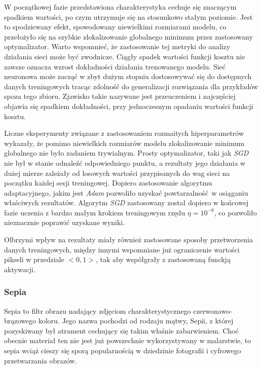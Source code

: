     W początkowej fazie przedstawiona charakterystyka cechuje się znaczącym spadkiem
    wartości, po czym utrzymuje się na stosunkowo stałym poziomie. Jest to spodziewany
    efekt, spowodowany niewielkimi rozmiarami modelu, co przełożyło się na szybkie
    zlokalizowanie globalnego minimum przez zastosowany optymalizator. Warto wspomnieć,
    że zastosowanie tej metryki do analizy działania sieci może być zwodnicze.
    Ciągły spadek wartości funkcji kosztu nie zawsze oznacza wzrost dokładności działania
    trenowanego modelu. Sieć neuronowa może zacząć w zbyt dużym stopniu dostosowywać się
    do dostępnych danych treningowych tracąc zdolność do generalizacji rozwiązania dla
    przykładów spoza tego zbioru. Zjawisko takie nazywane jest przeuczeniem i najczęściej
    objawia się spadkiem dokładności, przy jednoczesnym opadaniu wartości funkcji kosztu.

    Liczne eksperymenty związane z zastosowaniem rozmaitych hiperparametrów wykazały, że
    pomimo niewielkich rozmiarów modelu zlokalizowanie minimum globalnego nie było
    zadaniem trywialnym. Prosty optymalizator, taki jak \textit{SGD} nie był w stanie odnaleźć
    odpowiedniego punktu, a rezultaty jego działania w dużej mierze zależały od
    losowych wartości przypisanych do wag sieci na początku każdej sesji treningowej.
    Dopiero zastosowanie algorytmu adaptacyjnego, jakim jest \textit{Adam} pozwoliło
    uzyskać powtarzalność w osiąganiu właściwych rezultatów. Algorytm \textit{SGD}
    zastosowany został dopiero w końcowej fazie uczenia z bardzo małym krokiem
    treningowym rzędu $\eta = 10^{-8}$, co pozwoliło nieznacznie poprawić uzyskane
    wyniki.

    Olbrzymi wpływ na rezultaty miały również zastosowane sposoby przetworzenia danych
    treningowych, między innymi wspomniane już ograniczenie wartości pikseli
    w przedziale $<0,1>$, tak aby współgrały z zastosowaną funckją aktywacji.

  \subsubsection{Sepia}

    Sepia to filtr obrazu nadający zdjęciom charakterystycznego czerwonawo-brązowego
    koloru. Jego nazwa pochodzi od rodzaju mątwy, Sepii, z której pozyskiwany
    był atrament cechujący się takim właśnie zabarwieniem. Choć obecnie materiał ten
    nie jest już powszechnie wykorzystywany w malarstwie, to sepia wciąż cieszy się
    sporą popularnością w dziedzinie fotografii i cyfrowego przetwarzania obrazów.

